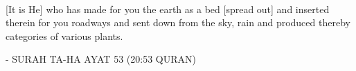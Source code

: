 \begin{center}
\normalsize
{}
\\[1cm]
[It is He] who has made for you the earth as a bed [spread out] and inserted therein for you roadways and sent down from the sky, rain and produced thereby categories of various plants.
\\[1cm]
\end{center}
\begin{flushright}
- SURAH TA-HA AYAT 53 (20:53 QURAN)
\end{flushright}